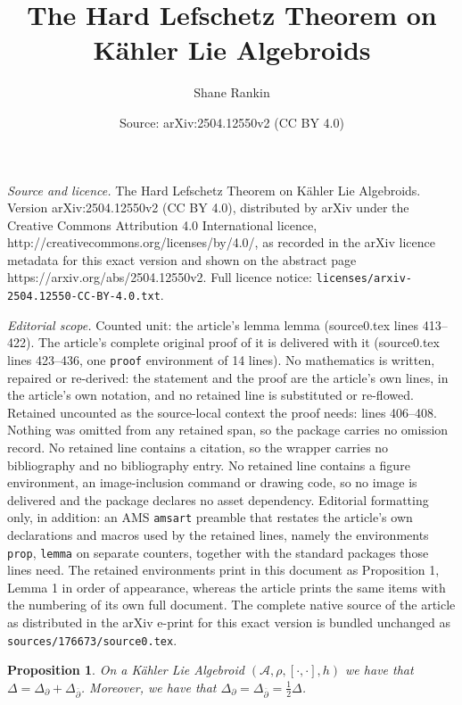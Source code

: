 \documentclass[10pt,a4paper]{amsart}
\title{The Hard Lefschetz Theorem on K\"ahler Lie Algebroids}
\author{Shane Rankin}
\date{Source: arXiv:2504.12550v2 (CC BY 4.0)}
\newtheorem{prop}{Proposition}
\newcommand{\A}{\mathcal{A}}
\newcommand{\p}{\partial}
\begin{document}
\maketitle

\noindent\emph{Source and licence.} The Hard Lefschetz Theorem on K\"ahler Lie Algebroids. Version arXiv:2504.12550v2 (CC BY 4.0), distributed by arXiv under the Creative Commons Attribution 4.0 International licence, http://creativecommons.org/licenses/by/4.0/, as recorded in the arXiv licence metadata for this exact version and shown on the abstract page https://arxiv.org/abs/2504.12550v2. Full licence notice: \texttt{licenses/arxiv-2504.12550-CC-BY-4.0.txt}.\par\smallskip

\noindent\textit{Editorial scope.} Counted unit: the article's lemma lemma (source0.tex lines 413--422). The article's complete original proof of it is delivered with it (source0.tex lines 423--436, one \texttt{proof} environment of 14 lines). No mathematics is written, repaired or re-derived: the statement and the proof are the article's own lines, in the article's own notation, and no retained line is substituted or re-flowed.  Retained uncounted as the source-local context the proof needs: lines 406--408.  Nothing was omitted from any retained span, so the package carries no omission record.  No retained line contains a citation, so the wrapper carries no bibliography and no bibliography entry.  No retained line contains a figure environment, an image-inclusion command or drawing code, so no image is delivered and the package declares no asset dependency.  Editorial formatting only, in addition: an AMS \texttt{amsart} preamble that restates the article's own declarations and macros used by the retained lines, namely the environments \texttt{prop}, \texttt{lemma} on separate counters, together with the standard packages those lines need.  The retained environments print in this document as Proposition 1, Lemma 1 in order of appearance, whereas the article prints the same items with the numbering of its own full document.  The complete native source of the article as distributed in the arXiv e-print for this exact version is bundled unchanged as \texttt{sources/176673/source0.tex}.
\begin{prop}\label{AllLaplaciansAreSame}
On a K\"ahler Lie Algebroid $(\A, \rho, [\cdot, \cdot], h)$ we have that $\Delta = \Delta_\p + \Delta_{\overline{\p}}$. Moreover, we have that $\Delta_\p = \Delta_{\overline{\p}} = \frac{1}{2}\Delta$.
\end{prop}
\end{document}
